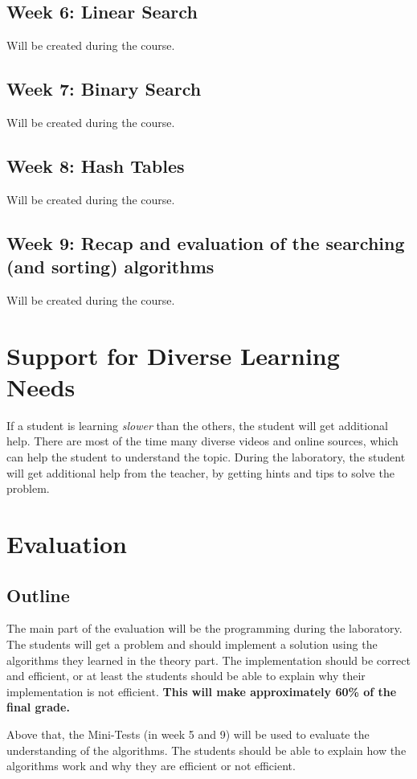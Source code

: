 \documentclass[10pt, oneside]{article}
\theoremstyle{remark}
\begin{document}
\subsection{Week 6: Linear Search}
Will be created during the course.

\subsection{Week 7: Binary Search}
Will be created during the course.

\subsection{Week 8: Hash Tables}
Will be created during the course.

\subsection{Week 9: Recap and evaluation of the searching (and sorting) algorithms}
Will be created during the course.

\section{Support for Diverse Learning Needs}
If a student is learning \textit{slower} than the others, the student will get additional help. There are most of the time many diverse videos and online sources, which can help the student to understand the topic. During the laboratory, the student will get additional help from the teacher, by getting hints and tips to solve the problem.

\section{Evaluation}
\subsection{Outline}
The main part of the evaluation will be the programming during the laboratory. The students will get a problem and should implement a solution using the algorithms they learned in the theory part. The implementation should be correct and efficient, or at least the students should be able to explain why their implementation is not efficient. \textbf{This will make approximately 60\% of the final grade.}

Above that, the Mini-Tests (in week 5 and 9) will be used to evaluate the understanding of the algorithms. The students should be able to explain how the algorithms work and why they are efficient or not efficient. 
\end{document}
